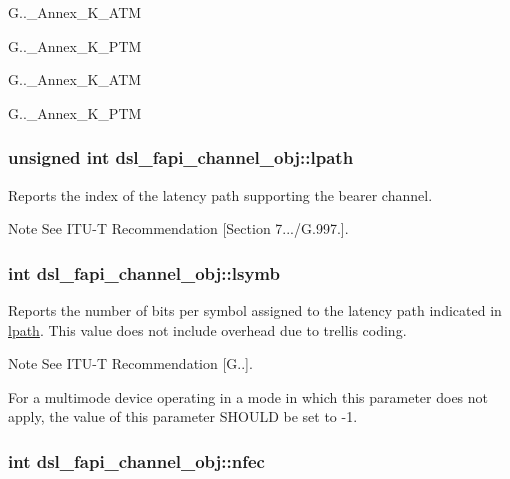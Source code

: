 \begin{DoxyItemize}
\item G..\-\_\-\-Annex\-\_\-\-K\-\_\-\-A\-T\-M
\item G..\-\_\-\-Annex\-\_\-\-K\-\_\-\-P\-T\-M
\item G..\-\_\-\-Annex\-\_\-\-K\-\_\-\-A\-T\-M
\item G..\-\_\-\-Annex\-\_\-\-K\-\_\-\-P\-T\-M 
\end{DoxyItemize}\hypertarget{structdsl__fapi__channel__obj_a29ec0882fb5449a659485d51f50b3b52}{
\subsubsection[{lpath}]{\setlength{\rightskip}{0pt plus 5cm}unsigned int dsl\-\_\-fapi\-\_\-channel\-\_\-obj\-::lpath}}\label{structdsl__fapi__channel__obj_a29ec0882fb5449a659485d51f50b3b52}
Reports the index of the latency path supporting the bearer channel. \begin{DoxyNote}{Note}
See I\-T\-U-\/\-T Recommendation \mbox{[}Section 7.../\-G.997.\mbox{]}. 
\end{DoxyNote}
\hypertarget{structdsl__fapi__channel__obj_a68826db35d08bc1124ee09bf5ccdf7a4}{
\subsubsection[{lsymb}]{\setlength{\rightskip}{0pt plus 5cm}int dsl\-\_\-fapi\-\_\-channel\-\_\-obj\-::lsymb}}\label{structdsl__fapi__channel__obj_a68826db35d08bc1124ee09bf5ccdf7a4}
Reports the number of bits per symbol assigned to the latency path indicated in \hyperlink{structdsl__fapi__channel__obj_a29ec0882fb5449a659485d51f50b3b52}{lpath}. This value does not include overhead due to trellis coding. \begin{DoxyNote}{Note}
See I\-T\-U-\/\-T Recommendation \mbox{[}G..\mbox{]}. 

For a multimode device operating in a mode in which this parameter does not apply, the value of this parameter S\-H\-O\-U\-L\-D be set to -\/1. 
\end{DoxyNote}
\hypertarget{structdsl__fapi__channel__obj_a16441831f8081dc4164f7a86dcccad96}{
\subsubsection[{nfec}]{\setlength{\rightskip}{0pt plus 5cm}int dsl\-\_\-fapi\-\_\-channel\-\_\-obj\-::nfec}}\label{structdsl__fapi__channel__obj_a16441831f8081dc4164f7a86dcccad96}
